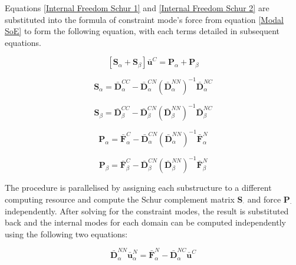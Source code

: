 \documentclass[../DomainDecomposition.tex]{subfiles}
\begin{document}
Equations \eqref{Internal Freedom Schur 1} and \eqref{Internal Freedom Schur 2} are substituted into the formula of constraint mode's force from equation \eqref{Modal SoE} to form the following equation, with each terms detailed in subsequent equations. 

\begin{equation}
    \left[
        \mathbf{S}_{\alpha} + 
        \mathbf{S}_{\beta} 
    \right]
    \bar{\mathbf{u}}^{C} 
    = 
    \mathbf{P}_{\alpha} + 
    \mathbf{P}_{\beta}
\end{equation}

\begin{equation}
    \mathbf{S}_{\alpha} 
    =
    \bar{\mathbf{D}}_{\alpha}^{CC} - 
    \bar{\mathbf{D}}_{\alpha}^{CN} 
    \left(
        \bar{\mathbf{D}}_{\alpha}^{NN} 
    \right)^{-1} 
    \bar{\mathbf{D}}_{\alpha}^{NC}
\end{equation}

\begin{equation}
    \mathbf{S}_{\beta} 
    =
    \bar{\mathbf{D}}_{\beta}^{CC} - 
    \bar{\mathbf{D}}_{\beta}^{CN} 
    \left(
        \bar{\mathbf{D}}_{\beta}^{NN} 
    \right)^{-1} 
    \bar{\mathbf{D}}_{\beta}^{NC}
\end{equation}

\begin{equation}
    \mathbf{P}_{\alpha} 
    =
    \bar{\mathbf{F}}_{\alpha}^{C} - 
    \bar{\mathbf{D}}_{\alpha}^{CN} 
    \left(
        \bar{\mathbf{D}}_{\alpha}^{NN} 
    \right)^{-1} 
    \bar{\mathbf{F}}_{\alpha}^{N} 
\end{equation}

\begin{equation}
    \mathbf{P}_{\beta} 
    =
    \bar{\mathbf{F}}_{\beta}^{C} - 
    \bar{\mathbf{D}}_{\beta}^{CN} 
    \left(
        \bar{\mathbf{D}}_{\beta}^{NN} 
    \right)^{-1} 
    \bar{\mathbf{F}}_{\beta}^{N} 
\end{equation}

The procedure is parallelised by assigning each substructure to a different computing resource and compute the Schur complement matrix $\mathbf{S}_{\cdot}$ and force $\mathbf{P}_{\cdot}$ independently.
After solving for the constraint modes, the result is substituted back and the internal modes for each domain can be computed independently using the following two equations: 

\begin{equation}
    \bar{\mathbf{D}}_{\alpha}^{NN} 
    \bar{\mathbf{u}}_{\alpha}^{N} 
    =
    \bar{\mathbf{F}}_{\alpha}^{N} - 
    \bar{\mathbf{D}}_{\alpha}^{NC} 
    \bar{\mathbf{u}}^{C} 
\end{equation}
\end{document}
